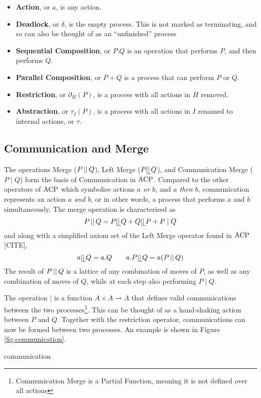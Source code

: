 \documentclass[../hons_project.tex]{subfiles}
\begin{document}
\begin{itemize}
   \item \textbf{Action}, or $a$, is any action.
   \item \textbf{Deadlock}, or $\delta$, is the empty process. This is not marked as terminating, and so can also be thought of as an ``unfinished'' process
   \item \textbf{Sequential Composition}, or $P . Q$ is an operation that performs $P$, and then performs $Q$.
   \item \textbf{Parallel Composition}, or $P + Q$ is a process that can perform $P$ or $Q$. 
   \item \textbf{Restriction}, or $\partial_{H}(P)$, is a process with all actions in $H$ removed.
   \item \textbf{Abstraction}, or $\tau_{I}(P)$, is a process with all actions in $I$ renamed to internal actions, or $\tau$.
\end{itemize}

\subsection{Communication and Merge}\label{ssec:acp-communication}
The operations Merge ($P \merge Q$), Left Merge ($P \leftmerge Q$), and Communication Merge ($P \mid Q$) form the basis of Communication in $\acp$. Compared to the other operators of $\acp$ which symbolise actions \textit{$a$ or $b$}, and \textit{$a$ then $b$}, communication represents an action \textit{$a$ and $b$}, or in other words, a process that performs $a$ and $b$ simultaneously. The merge operation is characterised as 
\[P \merge Q = P \leftmerge Q + Q \leftmerge P + P \mid Q\]
and along with a simplified axiom set of the Left Merge operator found in $\acp$ [CITE], 
\[a \leftmerge Q = a.Q \qquad a.P \leftmerge Q = a(P \merge Q)\]
The result of $P \merge Q$ is a lattice of any combination of moves of $P$, as well as any combination of moves of $Q$, while at each step also performing $P \mid Q$. 

The operation $\mid$ is a function $A \times A \rightharpoonup A$ that defines valid communications between the two processes\footnote{Communication Merge is a Partial Function, meaning it is not defined over all actions}. This can be thought of as a hand-shaking action between $P$ and $Q$. Together with the restriction operator, communications can now be formed between two processes. An example is shown in Figure \ref{fig:communication}.

{communication}
\end{document}
